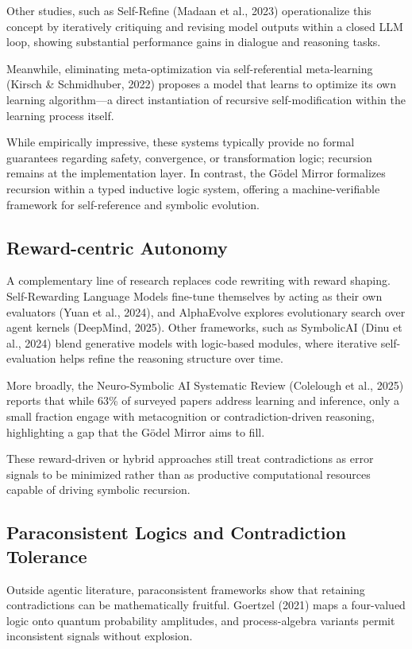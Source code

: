 \documentclass[manuscript,nonacm]{acmart}
\begin{document}
Other studies, such as Self-Refine (Madaan et al., 2023)\cite{madaan2023selfrefine} operationalize this concept by iteratively critiquing and revising model outputs within a closed LLM loop, showing substantial performance gains in dialogue and reasoning tasks.

Meanwhile, eliminating meta-optimization via self-referential meta-learning (Kirsch \& Schmidhuber, 2022)\cite{kirsch2022selfmeta} proposes a model that learns to optimize its own learning algorithm—a direct instantiation of recursive self-modification within the learning process itself.

While empirically impressive, these systems typically provide no formal guarantees regarding safety, convergence, or transformation logic; recursion remains at the implementation layer. In contrast, the Gödel Mirror formalizes recursion within a typed inductive logic system, offering a machine-verifiable framework for self-reference and symbolic evolution.

\subsection{Reward-centric Autonomy}
A complementary line of research replaces code rewriting with reward shaping. Self-Rewarding Language Models fine-tune themselves by acting as their own evaluators (Yuan et al., 2024)\cite{yuan2024selfrewarding}, and AlphaEvolve explores evolutionary search over agent kernels (DeepMind, 2025)\cite{deepmind2025alphaevolve}. Other frameworks, such as SymbolicAI (Dinu et al., 2024)\cite{dinu2024symbolicai} blend generative models with logic-based modules, where iterative self-evaluation helps refine the reasoning structure over time.

More broadly, the Neuro-Symbolic AI Systematic Review (Colelough et al., 2025)\cite{colelough2025review} reports that while 63\% of surveyed papers address learning and inference, only a small fraction engage with metacognition or contradiction-driven reasoning, highlighting a gap that the Gödel Mirror aims to fill.

These reward-driven or hybrid approaches still treat contradictions as error signals to be minimized rather than as productive computational resources capable of driving symbolic recursion.

\subsection{Paraconsistent Logics and Contradiction Tolerance}
Outside agentic literature, paraconsistent frameworks show that retaining contradictions can be mathematically fruitful. Goertzel (2021)\cite{goertzel2021paraconsistent} maps a four-valued logic onto quantum probability amplitudes, and process-algebra variants permit inconsistent signals without explosion.
\end{document}
